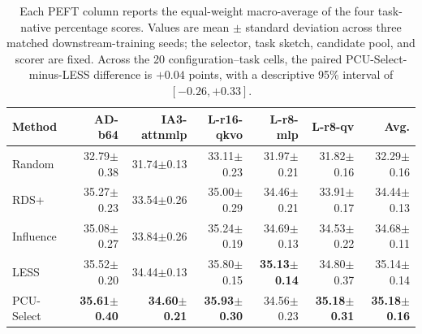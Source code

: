 \begin{table}[t]
\centering
\small
\setlength{\tabcolsep}{4pt}
\begin{tabular}{lrrrrrr}
\toprule
Method & AD-b64 & IA3-attnmlp & L-r16-qkvo & L-r8-mlp & L-r8-qv & Avg. \\
\midrule
Random & 32.79$\pm$0.38 & 31.74$\pm$0.13 & 33.11$\pm$0.23 & 31.97$\pm$0.21 & 31.82$\pm$0.16 & 32.29$\pm$0.16 \\
RDS+ & 35.27$\pm$0.23 & 33.54$\pm$0.26 & 35.00$\pm$0.29 & 34.46$\pm$0.21 & 33.91$\pm$0.17 & 34.44$\pm$0.13 \\
Influence & 35.08$\pm$0.27 & 33.84$\pm$0.26 & 35.24$\pm$0.19 & 34.69$\pm$0.13 & 34.53$\pm$0.22 & 34.68$\pm$0.11 \\
LESS & 35.52$\pm$0.20 & 34.44$\pm$0.13 & 35.80$\pm$0.15 & \textbf{35.13$\pm$0.14} & 34.80$\pm$0.37 & 35.14$\pm$0.14 \\
PCU-Select & \textbf{35.61$\pm$0.40} & \textbf{34.60$\pm$0.21} & \textbf{35.93$\pm$0.30} & 34.56$\pm$0.23 & \textbf{35.18$\pm$0.31} & \textbf{35.18$\pm$0.16} \\
\bottomrule
\end{tabular}
\caption{Each PEFT column reports the equal-weight macro-average of the four task-native percentage scores. Values are mean $\pm$ standard deviation across three matched downstream-training seeds; the selector, task sketch, candidate pool, and scorer are fixed. Across the 20 configuration--task cells, the paired PCU-Select-minus-LESS difference is $+0.04$ points, with a descriptive 95\% interval of $[-0.26,+0.33]$.}
\label{tab:main-results}
\end{table}

